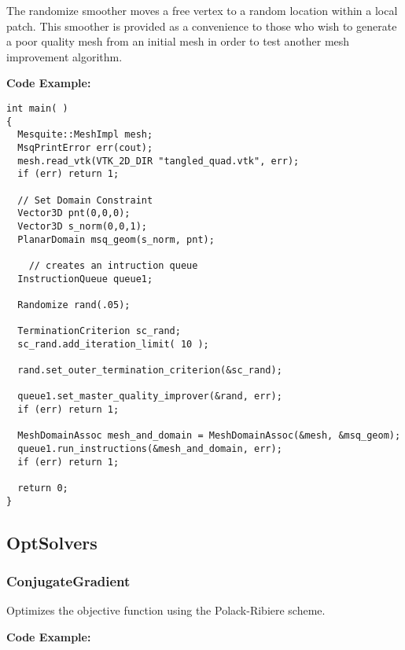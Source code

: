 The randomize smoother moves a free vertex to a random location within a local patch.  This smoother is provided as a convenience to
those who wish to generate a poor quality mesh from an initial mesh in order to test another mesh improvement algorithm.

\textbf{Code Example:}

\begin{lstlisting}[frame=single]
int main( )
{
  Mesquite::MeshImpl mesh;
  MsqPrintError err(cout);
  mesh.read_vtk(VTK_2D_DIR "tangled_quad.vtk", err);
  if (err) return 1;
  
  // Set Domain Constraint
  Vector3D pnt(0,0,0);
  Vector3D s_norm(0,0,1);
  PlanarDomain msq_geom(s_norm, pnt);
                                                                              
    // creates an intruction queue
  InstructionQueue queue1;
  
  Randomize rand(.05);
  
  TerminationCriterion sc_rand;
  sc_rand.add_iteration_limit( 10 );
 
  rand.set_outer_termination_criterion(&sc_rand);
  
  queue1.set_master_quality_improver(&rand, err);
  if (err) return 1;

  MeshDomainAssoc mesh_and_domain = MeshDomainAssoc(&mesh, &msq_geom);
  queue1.run_instructions(&mesh_and_domain, err);
  if (err) return 1;
  
  return 0;
}
\end{lstlisting}


\subsection{OptSolvers}

\subsubsection{ConjugateGradient}

Optimizes the objective function using the Polack-Ribiere scheme.

\textbf{Code Example:}

